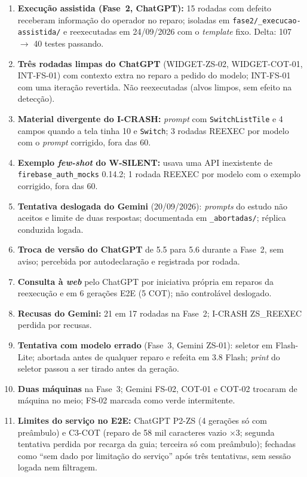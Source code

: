 \documentclass[12pt]{article}
\begin{document}
\begin{enumerate}\small
\item \textbf{Execução assistida (Fase~2, ChatGPT):} 15 rodadas com defeito receberam informação do operador no reparo; isoladas em \texttt{fase2/\_execucao-assistida/} e reexecutadas em 24/09/2026 com o \textit{template} fixo. Delta: 107 $\to$ 40 testes passando.
\item \textbf{Três rodadas limpas do ChatGPT} (WIDGET-ZS-02, WIDGET-COT-01, INT-FS-01) com contexto extra no reparo a pedido do modelo; INT-FS-01 com uma iteração revertida. Não reexecutadas (alvos limpos, sem efeito na detecção).
\item \textbf{Material divergente do I-CRASH:} \textit{prompt} com \texttt{SwitchListTile} e 4 campos quando a tela tinha 10 e \texttt{Switch}; 3 rodadas REEXEC por modelo com o \textit{prompt} corrigido, fora das 60.
\item \textbf{Exemplo \textit{few-shot} do W-SILENT:} usava uma API inexistente de \texttt{firebase\_auth\_mocks} 0.14.2; 1 rodada REEXEC por modelo com o exemplo corrigido, fora das 60.
\item \textbf{Tentativa deslogada do Gemini} (20/09/2026): \textit{prompts} do estudo não aceitos e limite de duas respostas; documentada em \texttt{\_abortadas/}; réplica conduzida logada.
\item \textbf{Troca de versão do ChatGPT} de 5.5 para 5.6 durante a Fase~2, sem aviso; percebida por autodeclaração e registrada por rodada.
\item \textbf{Consulta à \textit{web}} pelo ChatGPT por iniciativa própria em reparos da reexecução e em 6 gerações E2E (5 COT); não controlável deslogado.
\item \textbf{Recusas do Gemini:} 21 em 17 rodadas na Fase~2; I-CRASH ZS\_REEXEC perdida por recusas.
\item \textbf{Tentativa com modelo errado} (Fase~3, Gemini ZS-01): seletor em Flash-Lite; abortada antes de qualquer reparo e refeita em 3.8 Flash; \textit{print} do seletor passou a ser tirado antes da geração.
\item \textbf{Duas máquinas} na Fase~3; Gemini FS-02, COT-01 e COT-02 trocaram de máquina no meio; FS-02 marcada como verde intermitente.
\item \textbf{Limites do serviço no E2E:} ChatGPT P2-ZS (4 gerações só com preâmbulo) e C3-COT (reparo de 58 mil caracteres vazio $\times$3; segunda tentativa perdida por recarga da guia; terceira só com preâmbulo); fechadas como ``sem dado por limitação do serviço'' após três tentativas, sem sessão logada nem filtragem.

\end{enumerate}
\end{document}
